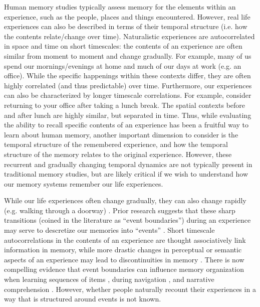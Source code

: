 \documentclass{article}
\begin{document}
{Human memory studies typically assess memory for the elements within an experience, such as the people, places and things encountered. However, real life experiences can also be described in terms of their temporal structure (i.e. how the contents relate/change over time).  Naturalistic experiences are autocorrelated in space and time on short timescales: the contents of an experience are often similar from moment to moment and change gradually. For example, many of us spend our mornings/evenings at home and much of our days at work (e.g. an office). While the specific happenings within these contexts differ, they are often highly correlated (and thus predictable) over time. Furthermore, our experiences can also be characterized by longer timescale correlations. For example, consider returning to your office after taking a lunch break. The spatial contexts before and after lunch are highly similar, but separated in time. Thus, while evaluating the ability to recall specific contents of an experience has been a fruitful way to learn about human memory, another important dimension to consider is the temporal structure of the remembered experience, and how the temporal structure of the memory relates to the original experience. However, these recurrent and gradually changing temporal dynamics are not typically present in traditional memory studies, but are likely critical if we wish to understand how our memory systems remember our life experiences.

While our life experiences often change gradually, they can also change rapidly (e.g. walking through a doorway) \citep{Radv12}. Prior research suggests that these sharp transitions (coined in the literature as ``event boundaries'') during an experience may serve to descretize our memories into ``events'' \citep{Radv12, RadvZack11, BrunEtal18, HeusEtal18, ClewDava18}. Short timescale autocorrelations in the contents of an experience are thought associatively link information in memory, while more drastic changes in perceptual or semantic aspects of an experience may lead to discontinuities in memory \citep{HeusEtal18, BrunEtal18, Radv12}. There is now compelling evidence that event boundaries can influence memory organization when learning sequences of items \citep{HeusEtal18, DuBrDava13}, during navigation \citep{BrunEtal18}, and narrative comprehension \citep{ZwaaRadv98, EzzyDava11}.  However, whether people naturally recount their experiences in a way that is structured around events is not known.

}
\end{document}
